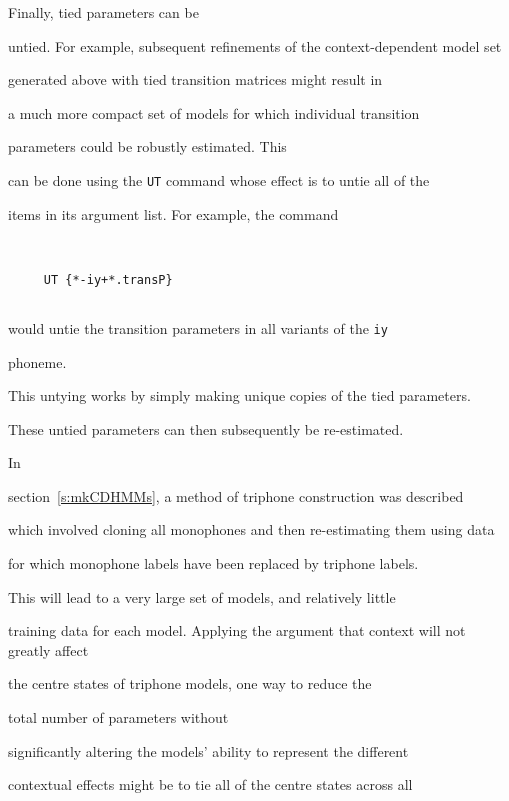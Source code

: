 Finally, tied parameters can be


untied.  For example,  subsequent refinements of the context-dependent model set


generated above with tied transition matrices might result in


a much more compact set of models for which individual transition


parameters could be robustly estimated.    This 


can be done using the \texttt{UT} command whose effect is to untie all of the


items in its argument list.  For example, the command


\begin{verbatim}


     UT {*-iy+*.transP}


\end{verbatim}


would untie the transition parameters in all variants of the \texttt{iy}


phoneme.


This untying works by simply making unique copies of the tied parameters.


These untied parameters can then subsequently be re-estimated.







 


In


section~\ref{s:mkCDHMMs}, a method of triphone construction was described


which involved cloning all monophones and then re-estimating them using data


for which monophone labels have been replaced by triphone labels.  


This will lead to a very large set of models, and relatively little


training data for each model.  Applying the argument that context will not greatly affect


the centre states of triphone models, one way to reduce the 


total number of parameters without 


significantly altering the models' ability to represent the different


contextual effects might be to tie all of the centre states across all


